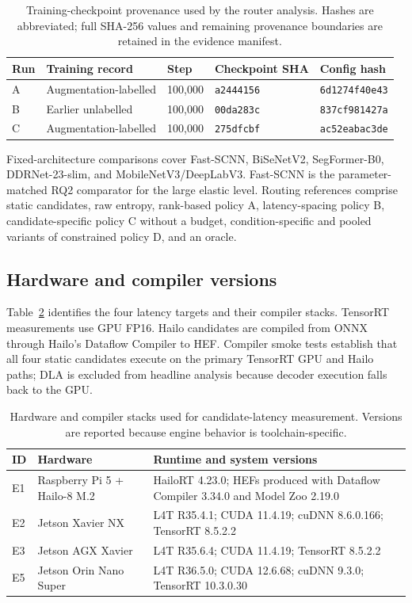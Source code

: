 \documentclass[a4paper,review,12pt]{elsarticle}
\begin{document}
\begin{table}[H]
\centering
\caption{Training-checkpoint provenance used by the router analysis. Hashes are abbreviated; full SHA-256 values and remaining provenance boundaries are retained in the evidence manifest.}
\label{tab:provenance}
\small
\begin{tabularx}{\textwidth}{@{}lXlll@{}}
\toprule
Run & Training record & Step & Checkpoint SHA & Config hash \\
\midrule
A & Augmentation-labelled & 100,000 & \texttt{a2444156} & \texttt{6d1274f40e43} \\
B & Earlier unlabelled & 100,000 & \texttt{00da283c} & \texttt{837cf981427a} \\
C & Augmentation-labelled & 100,000 & \texttt{275dfcbf} & \texttt{ac52eabac3de} \\
\bottomrule
\end{tabularx}
\end{table}

Fixed-architecture comparisons cover Fast-SCNN, BiSeNetV2, SegFormer-B0, DDRNet-23-slim, and MobileNetV3/DeepLabV3. Fast-SCNN is the parameter-matched RQ2 comparator for the large elastic level. Routing references comprise static candidates, raw entropy, rank-based policy A, latency-spacing policy B, candidate-specific policy C without a budget, condition-specific and pooled variants of constrained policy D, and an oracle.

\subsection{Hardware and compiler versions}

Table~\ref{tab:hardware} identifies the four latency targets and their compiler stacks. TensorRT measurements use GPU FP16. Hailo candidates are compiled from ONNX through Hailo's Dataflow Compiler to HEF. Compiler smoke tests establish that all four static candidates execute on the primary TensorRT GPU and Hailo paths; DLA is excluded from headline analysis because decoder execution falls back to the GPU.

\begin{table}[H]
\centering
\caption{Hardware and compiler stacks used for candidate-latency measurement. Versions are reported because engine behavior is toolchain-specific.}
\label{tab:hardware}
\small
\begin{tabularx}{\textwidth}{@{}llX@{}}
\toprule
ID & Hardware & Runtime and system versions \\
\midrule
E1 & Raspberry Pi 5 + Hailo-8 M.2 & HailoRT 4.23.0; HEFs produced with Dataflow Compiler 3.34.0 and Model Zoo 2.19.0 \\
E2 & Jetson Xavier NX & L4T R35.4.1; CUDA 11.4.19; cuDNN 8.6.0.166; TensorRT 8.5.2.2 \\
E3 & Jetson AGX Xavier & L4T R35.6.4; CUDA 11.4.19; TensorRT 8.5.2.2 \\
E5 & Jetson Orin Nano Super & L4T R36.5.0; CUDA 12.6.68; cuDNN 9.3.0; TensorRT 10.3.0.30 \\
\bottomrule
\end{tabularx}
\end{table}
\end{document}
